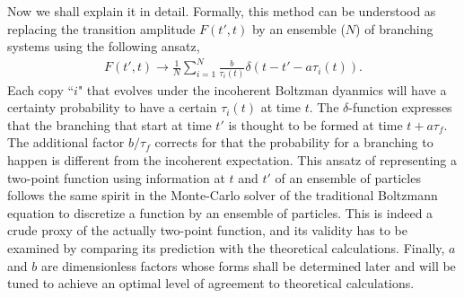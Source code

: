 Now we shall explain it in detail.
Formally, this method can be understood as replacing the transition amplitude $F(t',t)$ by an ensemble ($N$) of branching systems using the following ansatz,
\begin{eqnarray}
F(t', t) \rightarrow \frac{1}{N}\sum_{i=1}^N \frac{b}{\tau_i(t)} \delta(t-t'- a \tau_i(t)).
\end{eqnarray}
Each copy ``$i$" that evolves under the incoherent Boltzman dyanmics will have a certainty probability to have a certain $\tau_i(t)$ at time $t$.
The $\delta$-function expresses that the branching that start at time $t'$  is thought to be formed at time $t+a\tau_f$.
The additional factor $b/\tau_f$ corrects for that the probability for a branching to happen is different from the incoherent expectation.
This ansatz of representing a two-point function using information at $t$ and $t'$ of an ensemble of particles follows the same spirit in the Monte-Carlo solver of the traditional Boltzmann equation to discretize a function by an ensemble of particles.
This is indeed a crude proxy of the actually two-point function, and its validity has to be examined by comparing its prediction with the theoretical calculations.
Finally, $a$ and $b$ are dimensionless factors whose forms shall be determined later and will be tuned to achieve an optimal level of agreement to theoretical calculations.

